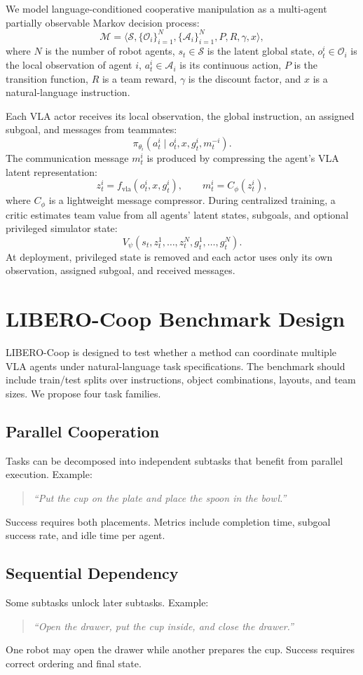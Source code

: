 \documentclass[11pt]{article}
\newcommand{\liberocoop}{LIBERO-Coop}
\begin{document}
We model language-conditioned cooperative manipulation as a multi-agent partially observable Markov decision process:
\[
\mathcal{M} = \langle \mathcal{S}, \{\mathcal{O}_i\}_{i=1}^{N}, \{\mathcal{A}_i\}_{i=1}^{N}, P, R, \gamma, x \rangle,
\]
where $N$ is the number of robot agents, $s_t \in \mathcal{S}$ is the latent global state, $o^i_t \in \mathcal{O}_i$ is the local observation of agent $i$, $a^i_t \in \mathcal{A}_i$ is its continuous action, $P$ is the transition function, $R$ is a team reward, $\gamma$ is the discount factor, and $x$ is a natural-language instruction.

Each VLA actor receives its local observation, the global instruction, an assigned subgoal, and messages from teammates:
\[
\pi_{\theta_i}(a^i_t \mid o^i_t, x, g^i_t, m^{-i}_t).
\]
The communication message $m^i_t$ is produced by compressing the agent's VLA latent representation:
\[
z^i_t = f_{\mathrm{vla}}(o^i_t, x, g^i_t), \qquad
m^i_t = C_{\phi}(z^i_t),
\]
where $C_{\phi}$ is a lightweight message compressor. During centralized training, a critic estimates team value from all agents' latent states, subgoals, and optional privileged simulator state:
\[
V_{\psi}(s_t, z^1_t,\ldots,z^N_t, g^1_t,\ldots,g^N_t).
\]
At deployment, privileged state is removed and each actor uses only its own observation, assigned subgoal, and received messages.

\section{\liberocoop{} Benchmark Design}

\liberocoop{} is designed to test whether a method can coordinate multiple VLA agents under natural-language task specifications. The benchmark should include train/test splits over instructions, object combinations, layouts, and team sizes. We propose four task families.

\subsection{Parallel Cooperation}
Tasks can be decomposed into independent subtasks that benefit from parallel execution. Example:
\begin{quote}
\emph{``Put the cup on the plate and place the spoon in the bowl.''}
\end{quote}
Success requires both placements. Metrics include completion time, subgoal success rate, and idle time per agent.

\subsection{Sequential Dependency}
Some subtasks unlock later subtasks. Example:
\begin{quote}
\emph{``Open the drawer, put the cup inside, and close the drawer.''}
\end{quote}
One robot may open the drawer while another prepares the cup. Success requires correct ordering and final state.
\end{document}
